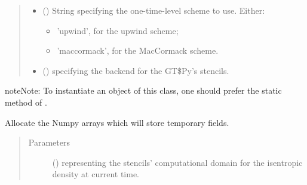 \documentclass[letterpaper,10pt,english]{sphinxmanual}
\begin{document}
\begin{fulllineitems}
\begin{fulllineitems}
\begin{quote}
\begin{description}
\begin{itemize}
\item {} 
 () \textendash{} 
String specifying the one-time-level scheme to use. Either:
\begin{itemize}
\item {} 
’upwind’, for the upwind scheme;

\item {} 
’maccormack’, for the MacCormack scheme.

\end{itemize}


\item {} 
 () \textendash{}  specifying the backend for the GT\$Py’s stencils.

\end{itemize}

\end{description}\end{quote}

\begin{sphinxadmonition}{note}{Note:}
To instantiate an object of this class, one should prefer the static method
{\hyperref[\detokenize{api:dycore.prognostic_isentropic.PrognosticIsentropic.factory}]{}} of
{\hyperref[\detokenize{api:dycore.prognostic_isentropic.PrognosticIsentropic}]{}}.
\end{sphinxadmonition}

\end{fulllineitems}


\begin{fulllineitems}
\label{\detokenize{api:dycore.prognostic_isentropic.PrognosticIsentropicTL1._allocate_temporaries}}
Allocate the Numpy arrays which will store temporary fields.
\begin{quote}\begin{description}
\item[{Parameters}] \leavevmode
{} () \textendash{}  representing the stencils’ computational domain for the isentropic density
at current time.


\end{description}
\end{quote}
\end{fulllineitems}
\end{fulllineitems}
\end{document}

